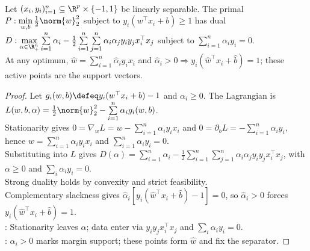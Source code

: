 \begin{proposition} \label{prop:sl-hard-margin-dual-support-vectors} \\
Let $(x_i,y_i)_{i=1}^n\subseteq\R^p\times\{-1,1\}$ be linearly separable. The primal $P:\min\limits_{w,b}\frac12\norm{w}_2^2$ subject to $y_i(w^\top x_i+b)\geq1$ has dual $D:\max\limits_{\alpha\in\R_+^n}\sum\limits_{i=1}^{n}\alpha_i-\frac12\sum\limits_{i=1}^{n}\sum\limits_{j=1}^{n}\alpha_i\alpha_jy_iy_j x_i^\top x_j$ subject to $\sum\limits_{i=1}^n\alpha_i y_i=0$.\\
At any optimum, $\widehat{w}=\sum\limits_{i=1}^n\widehat{\alpha}_iy_ix_i$ and $\widehat{\alpha}_i>0\Rightarrow y_i(\widehat{w}^\top x_i+\widehat{b})=1$; these active points are the support vectors.
\end{proposition}
\begin{proof} Let $g_i(w,b)\defeq y_i(w^\top x_i+b)-1$ and $\alpha_i\geq0$. The Lagrangian is $L(w,b,\alpha)=\frac12\norm{w}_2^2-\sum\limits_{i=1}^n\alpha_i g_i(w,b)$.\\
Stationarity gives $0=\nabla_wL=w-\sum\limits_{i=1}^n\alpha_i y_i x_i$ and $0=\partial_bL=-\sum\limits_{i=1}^n\alpha_i y_i$, hence $w=\sum\limits_{i=1}^n\alpha_i y_i x_i$ and $\sum\limits_{i=1}^n\alpha_i y_i=0$.\\
Substituting into $L$ gives $D(\alpha)=\sum\limits_{i=1}^n\alpha_i-\frac12\sum\limits_{i=1}^n\sum\limits_{j=1}^n\alpha_i\alpha_jy_iy_jx_i^\top x_j$, with $\alpha\geq0$ and $\sum\limits_i\alpha_i y_i=0$.\\
Strong duality holds by convexity and strict feasibility.\\
Complementary slackness gives $\widehat{\alpha}_i[y_i(\widehat{w}^\top x_i+\widehat{b})-1]=0$, so $\widehat{\alpha}_i>0$ forces $y_i(\widehat{w}^\top x_i+\widehat{b})=1$.\\
: Stationarity leaves $\alpha$; data enter via $y_iy_jx_i^\top x_j$ and $\sum\limits_i\alpha_i y_i=0$.\\
: $\alpha_i>0$ marks margin support; these points form $\widehat{w}$ and fix the separator.
\end{proof}

